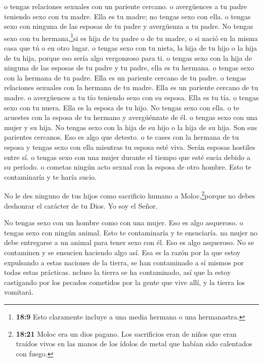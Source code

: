  o tengas relaciones sexuales con un pariente cercano.
 o avergüences a tu padre teniendo sexo con tu madre. Ella
es tu madre; no tengas sexo con ella.  o tengas sexo con
ninguna de las esposas de tu padre y avergüenza a tu padre. 
No tengas sexo con tu hermana,\footnote{\textbf{18:9} Esto claramente
  incluye a una media hermana o una hermanastra.}si es hija de tu padre
o de tu madre, o si nació en la misma casa que tú o en otro lugar.
 o tengas sexo con tu nieta, la hija de tu hijo o la hija
de tu hija, porque eso sería algo vergonzoso para ti.  o
tengas sexo con la hija de ninguna de las esposas de tu padre y tu
padre, ella es tu hermana.  o tengas sexo con la hermana de
tu padre. Ella es un pariente cercano de tu padre.  o
tengas relaciones sexuales con la hermana de tu madre. Ella es un
pariente cercano de tu madre.  o avergüences a tu tío
teniendo sexo con su esposa. Ella es tu tía.  o tengas sexo
con tu nuera. Ella es la esposa de tu hijo. No tengas sexo con ella.
 o te acuestes con la esposa de tu hermano y avergüénzate
de él.  o tengas sexo con una mujer y su hija. No tengas
sexo con la hija de su hijo o la hija de su hija. Son sus parientes
cercanos. Eso es algo que detesto.  o te cases con la
hermana de tu esposa y tengas sexo con ella mientras tu esposa esté
viva. Serán esposas hostiles entre sí.  o tengas sexo con
una mujer durante el tiempo que esté sucia debido a su período.
 o cometas ningún acto sexual con la esposa de otro hombre.
Esto te contaminaría y te haría sucio.

 No le des ninguno de tus hijos como sacrificio humano a
Moloc,\footnote{\textbf{18:21} Moloc era un dios pagano. Los sacrificios
  eran de niños que eran traídos vivos en las manos de los ídolos de
  metal que habían sido calentados con fuego.}porque no debes deshonrar
el carácter de tu Dios. Yo soy el Señor.

 No tengas sexo con un hombre como con una mujer. Eso es
algo asqueroso.  o tengas sexo con ningún animal. Esto te
contaminaría y te ensuciaría.  na mujer no debe entregarse
a un animal para tener sexo con él. Eso es algo asqueroso. No se
contaminen y se ensucien haciendo algo así. Esa es la razón por la que
estoy expulsando a estas naciones de la tierra, se han contaminado a sí
mismos por todas estas prácticas.  ncluso la tierra se ha
contaminado, así que la estoy castigando por los pecados cometidos por
la gente que vive allí, y la tierra los vomitará.

